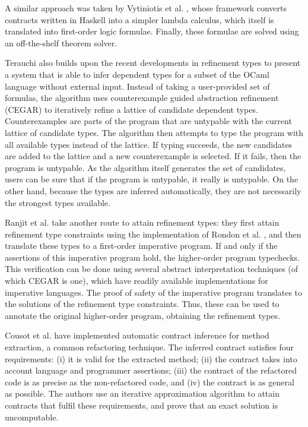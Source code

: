\documentclass[10pt]{report}
\begin{document}
A similar approach was taken by Vytiniotis et al. \cite{Vytiniotis:2013ww}, whose framework converts contracts written in Haskell into a simpler lambda calculus, which itself is translated into first-order logic formulae.
Finally, these formulae are solved using an off-the-shelf theorem solver.

Terauchi \cite{terauchi2010dependent} also builds upon the recent developments in refinement types to present a system that is able to infer dependent types for a subset of the OCaml language without external input.
Instead of taking a user-provided set of formulas, the algorithm uses counterexample guided abstraction refinement (CEGAR) to iteratively refine a lattice of candidate dependent types.
Counterexamples are parts of the program that are untypable with the current lattice of candidate types.
The algorithm then attempts to type the program with all available types instead of the lattice.
If typing succeeds, the new candidates are added to the lattice and a new counterexample is selected.
If it fails, then the program is untypable.
As the algorithm itself generates the set of candidates, users can be sure that if the program is untypable, it really is untypable.
On the other hand, because the types are inferred automatically, they are not necessarily the strongest types available.

Ranjit et al. \cite{jhala2010refinement} take another route to attain refinement types: they first attain refinement type constraints using the implementation of Rondon et al. \cite{rondon2008liquid}, and then translate these types to a first-order imperative program.
If and only if the assertions of this imperative program hold, the higher-order program typechecks.
This verification can be done using several abstract interpretation techniques (of which CEGAR is one), which have readily available implementations for imperative languages.
The proof of safety of the imperative program translates to the solutions of the refinement type constraints.
Thus, these can be used to annotate the original higher-order program, obtaining the refinement types.

Cousot et al. \cite{cousotabstract} have implemented automatic contract inference for method extraction, a common refactoring technique.
The inferred contract satisfies four requirements: (i) it is valid for the extracted method; (ii) the contract takes into account language and programmer assertions; (iii) the contract of the refactored code is as precise as the non-refactored code, and (iv) the contract is as general as possible.
The authors use an iterative approximation algorithm to attain contracts that fulfil these requirements, and prove that an exact solution is uncomputable.
\end{document}
